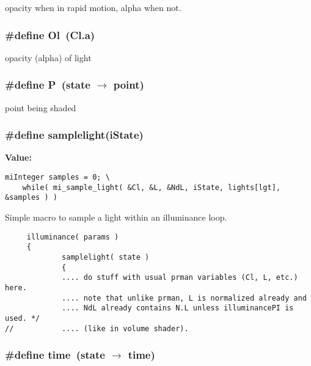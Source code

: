 opacity when in rapid motion, alpha when not. 

\subsubsection{\setlength{\rightskip}{0pt plus 5cm}\#define Ol\ (Cl.a)}\label{mrRman__macros_8h_a13}


opacity (alpha) of light 

\subsubsection{\setlength{\rightskip}{0pt plus 5cm}\#define P\ (state $\rightarrow$ point)}\label{mrRman__macros_8h_a3}


point being shaded 

\subsubsection{\setlength{\rightskip}{0pt plus 5cm}\#define samplelight(i\-State)}\label{mrRman__macros_8h_a20}


{\bf Value:}

\footnotesize\begin{verbatim}miInteger samples = 0; \
    while( mi_sample_light( &Cl, &L, &NdL, iState, lights[lgt], &samples ) )
\end{verbatim}\normalsize 
Simple macro to sample a light within an illuminance loop.



\footnotesize\begin{verbatim}     illuminance( params )
     {
             samplelight( state )
             {
             .... do stuff with usual prman variables (Cl, L, etc.) here.
             .... note that unlike prman, L is normalized already and
             .... NdL already contains N.L unless illuminancePI is used. */
//           .... (like in volume shader).
\end{verbatim}
\normalsize
{}
\subsubsection{\setlength{\rightskip}{0pt plus 5cm}\#define time\ (state $\rightarrow$ time)}\label{mrRman__macros_8h_a12}


